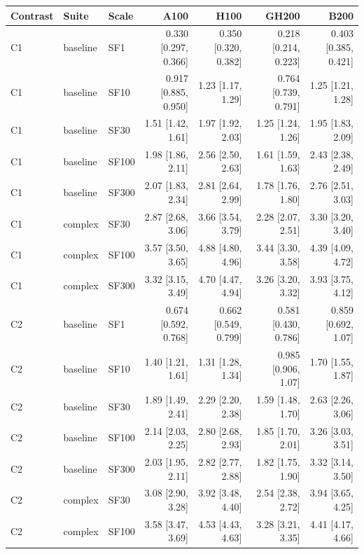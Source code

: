 \begin{longtable}{lllrrrr}
\toprule
Contrast & Suite & Scale & A100 & H100 & GH200 & B200 \\
\midrule
\endhead
\bottomrule
\endfoot
C1 & baseline & SF1 & 0.330 [0.297, 0.366] & 0.350 [0.320, 0.382] & 0.218 [0.214, 0.223] & 0.403 [0.385, 0.421] \\
C1 & baseline & SF10 & 0.917 [0.885, 0.950] & 1.23 [1.17, 1.29] & 0.764 [0.739, 0.791] & 1.25 [1.21, 1.28] \\
C1 & baseline & SF30 & 1.51 [1.42, 1.61] & 1.97 [1.92, 2.03] & 1.25 [1.24, 1.26] & 1.95 [1.83, 2.09] \\
C1 & baseline & SF100 & 1.98 [1.86, 2.11] & 2.56 [2.50, 2.63] & 1.61 [1.59, 1.63] & 2.43 [2.38, 2.49] \\
C1 & baseline & SF300 & 2.07 [1.83, 2.34] & 2.81 [2.64, 2.99] & 1.78 [1.76, 1.80] & 2.76 [2.51, 3.03] \\
C1 & complex & SF30 & 2.87 [2.68, 3.06] & 3.66 [3.54, 3.79] & 2.28 [2.07, 2.51] & 3.30 [3.20, 3.40] \\
C1 & complex & SF100 & 3.57 [3.50, 3.65] & 4.88 [4.80, 4.96] & 3.44 [3.30, 3.58] & 4.39 [4.09, 4.72] \\
C1 & complex & SF300 & 3.32 [3.15, 3.49] & 4.70 [4.47, 4.94] & 3.26 [3.20, 3.32] & 3.93 [3.75, 4.12] \\
C2 & baseline & SF1 & 0.674 [0.592, 0.768] & 0.662 [0.549, 0.799] & 0.581 [0.430, 0.786] & 0.859 [0.692, 1.07] \\
C2 & baseline & SF10 & 1.40 [1.21, 1.61] & 1.31 [1.28, 1.34] & 0.985 [0.906, 1.07] & 1.70 [1.55, 1.87] \\
C2 & baseline & SF30 & 1.89 [1.49, 2.41] & 2.29 [2.20, 2.38] & 1.59 [1.48, 1.70] & 2.63 [2.26, 3.06] \\
C2 & baseline & SF100 & 2.14 [2.03, 2.25] & 2.80 [2.68, 2.93] & 1.85 [1.70, 2.01] & 3.26 [3.03, 3.51] \\
C2 & baseline & SF300 & 2.03 [1.95, 2.11] & 2.82 [2.77, 2.88] & 1.82 [1.75, 1.90] & 3.32 [3.14, 3.50] \\
C2 & complex & SF30 & 3.08 [2.90, 3.28] & 3.92 [3.48, 4.40] & 2.54 [2.38, 2.72] & 3.94 [3.65, 4.25] \\
C2 & complex & SF100 & 3.58 [3.47, 3.69] & 4.53 [4.43, 4.63] & 3.28 [3.21, 3.35] & 4.41 [4.17, 4.66] \\

\end{longtable}
